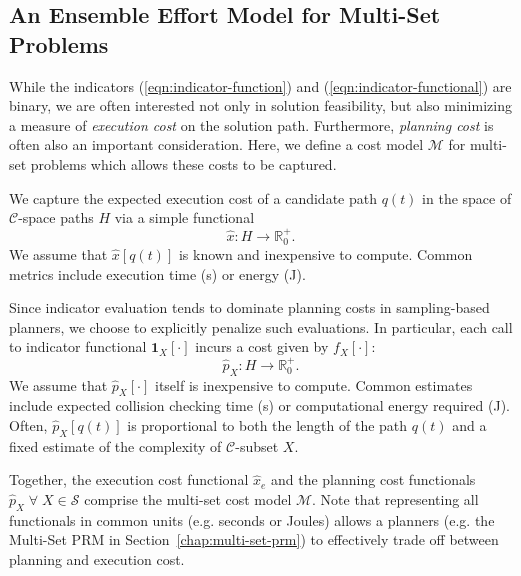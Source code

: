 \subsection{An Ensemble Effort Model for Multi-Set Problems}
\label{subsec:cost-model}

While the indicators
(\ref{eqn:indicator-function}) and (\ref{eqn:indicator-functional})
are binary,
we are often interested not only in solution feasibility,
but also minimizing a measure of \emph{execution cost}
on the solution path.
Furthermore,
\emph{planning cost} is often also an important consideration.
Here,
we define a cost model $\mathcal{M}$
for multi-set problems
which allows these costs to be captured.

We capture the expected execution cost of a candidate path
$q(t)$ in the space of $\mathcal{C}$-space paths $H$
via a simple functional
\begin{equation}
  \hat{x} : H \rightarrow \mathbb{R}_0^+ .
\end{equation}
We assume that $\hat{x}[q(t)]$ is known and inexpensive to compute.
Common metrics include
execution time (s) or energy (J).

Since indicator evaluation tends to dominate planning costs
in sampling-based planners,
we choose to explicitly penalize such evaluations.
In particular,
each call to indicator functional $\mathbf{1}_X[\cdot]$
incurs a cost given by $f_X[\cdot]$:
\begin{equation}
  {\hat p}_X : H \rightarrow \mathbb{R}_0^+ .
\end{equation}
We assume that ${\hat p}_X[\cdot]$ itself is inexpensive to compute.
Common estimates include expected collision checking time (s)
or computational energy required (J).
Often, ${\hat p}_X[q(t)]$ is proportional to both
the length of the path $q(t)$
and a fixed estimate of the complexity of $\mathcal{C}$-subset $X$.

Together, the execution cost functional ${\hat x}_e$
and the planning cost functionals ${\hat p}_X \;\forall\; X \in \mathcal{S}$
comprise the multi-set cost model $\mathcal{M}$.
Note that representing all functionals in common units
(e.g. seconds or Joules) allows a planners
(e.g. the Multi-Set PRM in Section~\ref{chap:multi-set-prm})
to effectively trade off between planning and execution cost.

